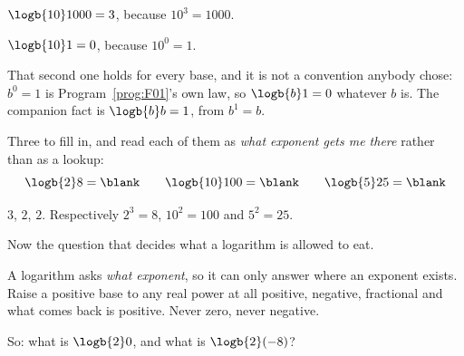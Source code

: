 \begin{fr}
\begin{ansblock}
$\logb{10} 1000 = 3$, because $10^{3} = 1000$.

$\logb{10} 1 = 0$, because $10^{0} = 1$.
\end{ansblock}

That second one holds for every base, and it is not a convention anybody chose:
$b^{0} = 1$ is Program~\ref{prog:F01}'s own law, so $\logb{b} 1 = 0$ whatever
$b$ is. The companion fact is $\logb{b} b = 1$, from $b^{1} = b$.

Three to fill in, and read each of them as \emph{what exponent gets me there}
rather than as a lookup:
\[ \logb{2} 8 = \blank \qquad \logb{10} 100 = \blank \qquad
   \logb{5} 25 = \blank \]
\dotline
\nextframe
\end{fr}

\begin{fr}
\begin{ansblock}
$3$, \quad $2$, \quad $2$. \quad Respectively $2^{3} = 8$, $10^{2} = 100$ and
$5^{2} = 25$.
\end{ansblock}

Now the question that decides what a logarithm is allowed to eat.

A logarithm asks \emph{what exponent}, so it can only answer where an exponent
exists. Raise a positive base to any real power at all \dash{} positive,
negative, fractional \dash{} and what comes back is positive. Never zero, never
negative.

So: what is $\logb{2} 0$, and what is $\logb{2}(-8)$?
\nextframe
\end{fr}

